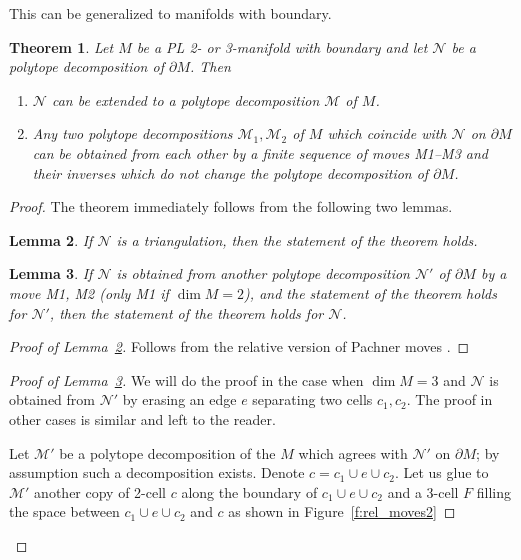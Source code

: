 \documentclass{amsart}
\newtheorem{theorem}{Theorem}[section]
\newtheorem{lemma}[theorem]{Lemma}
\theoremstyle{definition}
\theoremstyle{remark}
\numberwithin{equation}{section}
\newcommand{\firef}[1]{Figure~{\rm\ref{#1}}}
\newcommand{\leref}[1]{Lemma~{\rm\ref{#1}}}
\newcommand{\del}{\partial}
\newcommand{\<}{\langle}
\renewcommand{\>}{\rangle}
\newcommand{\N}{\mathcal{N}}       %
\newcommand{\M}{\mathcal{M}}      %
\begin{document}
This can be generalized to manifolds with boundary.


\begin{theorem}\label{t:moves_rel}
  Let $M$ be a PL 2- or 3-manifold with boundary and let $\N$ be a
  polytope decomposition of $\del M$. Then
  \begin{enumerate}
  \item $\N$ can be extended to a polytope decomposition $\M$ of $M$.
  \item Any two polytope decompositions $\M_1, \M_2$ of $M$ which coincide
  with $\N$ on  $\del M$ can be obtained from each other by  a finite
  sequence of moves M1--M3 and their  inverses which do not change the
  polytope decomposition of $\del M$.
  \end{enumerate}
\end{theorem}
\begin{proof}
 The theorem immediately follows from the following two lemmas. 
 \begin{lemma}\label{l:moves_rel1}
  If $\N$ is a triangulation, then the statement of the theorem holds. 
 \end{lemma}
 \begin{lemma}\label{l:moves_rel2}
  If $\N$ is obtained from another polytope decomposition $\N'$ of $\del 
  M$ by a move M1, M2 \textup{(}only M1 if $\dim M=2$\textup{)}, and the
  statement of the theorem holds for $\N'$, then the statement of the
  theorem holds for $\N$.
 \end{lemma}
\begin{proof}[Proof of \leref{l:moves_rel1}]
  Follows from the relative version of Pachner moves .
\end{proof}
 \begin{proof}[Proof of \leref{l:moves_rel2}]


  We will do the proof in the case when $\dim M=3$ and $\N$ is obtained
  from $\N'$ by erasing an edge $e$ separating two cells $c_1, c_2$.  The
  proof in other cases is   similar and left to the reader. 

  Let $\M'$ be a polytope decomposition of the $M$ which agrees with
  $\N'$ on $\del M$; by assumption such a decomposition exists. Denote
  $c=c_1\cup e\cup c_2$. Let us glue to $\M'$ another copy of 2-cell $c$
  along the boundary of $c_1\cup e\cup c_2$ and a 3-cell $F$ filling the
  space between $c_1\cup e\cup c_2$ and $c$ as   shown in
  \firef{f:rel_moves2} 


\end{proof}
\end{proof}
\end{document}
